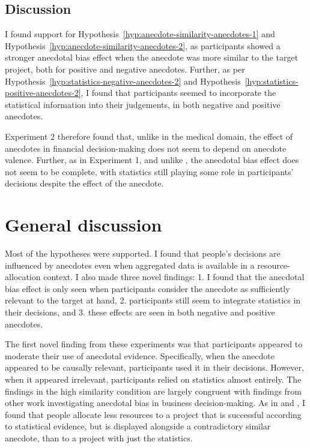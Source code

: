 \documentclass[a4paper, nobind, dvipsnames]{templates/ociamthesis}
\theoremstyle{definition}
\theoremstyle{definition}
\theoremstyle{definition}
\theoremstyle{definition}
\theoremstyle{remark}
\begin{document}
\hypertarget{discussion-5}{%
\subsection{Discussion}\label{discussion-5}}

I found support for Hypothesis~\ref{hyp:anecdote-similarity-anecdotes-1} and
Hypothesis~\ref{hyp:anecdote-similarity-anecdotes-2}, as participants showed a
stronger anecdotal bias effect when the anecdote was more similar to the target
project, both for positive and negative anecdotes. Further, as per
Hypothesis~\ref{hyp:statistics-negative-anecdotes-2} and
Hypothesis~\ref{hyp:statistics-positive-anecdotes-2}, I found that participants
seemed to incorporate the statistical information into their judgements, in both
negative and positive anecdotes.

Experiment 2 therefore found that, unlike in the medical domain, the effect of
anecdotes in financial decision-making does not seem to depend on anecdote
valence. Further, as in Experiment 1, and unlike \textcite{wainberg2013}, the anecdotal
bias effect does not seem to be complete, with statistics still playing some
role in participants' decisions despite the effect of the anecdote.

\hypertarget{general-discussion-2}{%
\section{General discussion}\label{general-discussion-2}}

Most of the hypotheses were supported. I found that people's decisions are
influenced by anecdotes even when aggregated data is available in a
resource-allocation context. I also made three novel findings: 1. I found that
the anecdotal bias effect is only seen when participants consider the anecdote
as sufficiently relevant to the target at hand, 2. participants still seem to
integrate statistics in their decisions, and 3. these effects are seen in both
negative and positive anecdotes.

The first novel finding from these experiments was that participants appeared to
moderate their use of anecdotal evidence. Specifically, when the anecdote
appeared to be causally relevant, participants used it in their decisions.
However, when it appeared irrelevant, participants relied on statistics almost
entirely. The findings in the high similarity condition are largely congruent
with findings from other work investigating anecdotal bias in business
decision-making. As in \textcite{wainberg2013} and \textcite{wainberg2018}, I found that people
allocate less resources to a project that is successful according to statistical
evidence, but is displayed alongside a contradictory similar anecdote, than to a
project with just the statistics.
\end{document}
